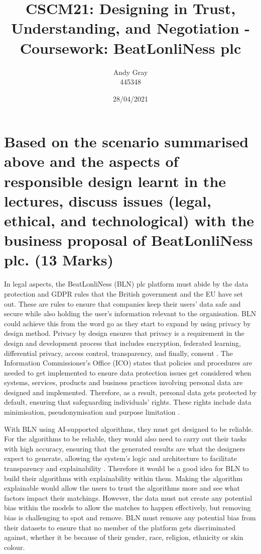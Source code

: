 \documentclass[a4paper,10pt]{article}
\begin{document}
\title{CSCM21: Designing in Trust, Understanding, and Negotiation - Coursework: BeatLonliNess plc}
\author{Andy Gray\\445348}
\date{28/04/2021}

\maketitle

\section{Based on the scenario summarised above and the aspects of responsible design learnt in the lectures, discuss issues (legal, ethical, and technological) with the business proposal of BeatLonliNess plc. (13 Marks)}
\label{sec:intro}

	In legal aspects, the BeatLonliNess (BLN) plc platform must abide by the data protection and GDPR rules that the British government and the EU have set out. These are rules to ensure that companies keep their users' data safe and secure while also holding the user's information relevant to the organisation. BLN could achieve this from the word go as they start to expand by using privacy by design method. Privacy by design ensures that privacy is a requirement in the design and development process that includes encryption, federated learning, differential privacy, access control, transparency, and finally, consent \cite{berte_slides_ai_law_overview}. The Information Commissioner's Office (ICO) states that policies and procedures are needed to get implemented to ensure data protection issues get considered when systems, services, products and business practices involving personal data are designed and implemented. Therefore, as a result, personal data gets protected by default, ensuring that safeguarding individuals' rights. These rights include data minimisation, pseudonymisation and purpose limitation \cite{ico_website}. 

	With BLN using AI-supported algorithms, they must get designed to be reliable. For the algorithms to be reliable, they would also need to carry out their tasks with high accuracy, ensuring that the generated results are what the designers expect to generate, allowing the system's logic and architecture to facilitate transparency and explainability \cite{adam_slides_regulating_ai}. Therefore it would be a good idea for BLN to build their algorithms with explainability within them. Making the algorithm explainable would allow the users to trust the algorithms more and see what factors impact their matchings. However, the data must not create any potential bias within the models to allow the matches to happen effectively, but removing bias is challenging to spot and remove. BLN must remove any potential bias from their datasets to ensure that no member of the platform gets discriminated against, whether it be because of their gender, race, religion, ethnicity or skin colour. 
\end{document}
